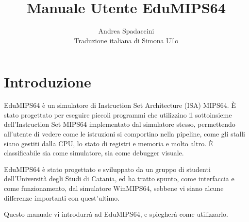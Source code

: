 \documentclass[12pt]{report}
\author{Andrea Spadaccini\\Traduzione italiana di Simona Ullo}
\title{Manuale Utente EduMIPS64 \EV}
\newcommand{\EM}{EduMIPS64}
\newcommand{\MS}{MIPS64}
\begin{document}
\setlength{\baselineskip}{1.60\baselineskip} %

\newlength{\centeroffset}
\setlength{\centeroffset}{-0.5\oddsidemargin}
\addtolength{\centeroffset}{0.5\evensidemargin}
\thispagestyle{empty}
\noindent\hspace*{\centeroffset}

\noindent\hspace*{\centeroffset}



\pagebreak

\tableofcontents
\listoftables
\lstlistoflistings
\chapter*{Introduzione}
\EM{} \`e un simulatore di Instruction Set Architecture (ISA) \MS{}. \`E stato
progettato per eseguire piccoli programmi che utilizzino il sottoinsieme
dell'Instruction Set \MS{} implementato dal simulatore stesso, permettendo
all'utente di vedere come le istruzioni si comportino nella pipeline, come gli
stalli siano gestiti dalla CPU, lo stato di registri e memoria e molto altro.
\`E classificabile sia come simulatore, sia come debugger visuale.

\EM{} \`e stato progettato e sviluppato da un gruppo di studenti
dell'Universit\`a degli Studi di Catania, ed ha tratto spunto, come interfaccia
e come funzionamento, dal simulatore WinMIPS64, sebbene vi siano alcune
differenze importanti con quest'ultimo.

Questo manuale vi introdurr\`a ad \EM{}, e spiegher\`a come utilizzarlo.
\end{document}
